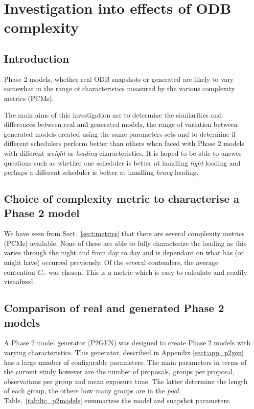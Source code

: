 \section{Investigation into effects of ODB complexity}
\label{sect:exp_complexity}

\subsection{Introduction}
Phase 2 models, whether real ODB snapshots or generated are likely to vary somewhat in the range of characteristics measured by the various complexity metrics (PCMs). 

The main aims of this investigation are to determine the similarities and differences between real and generated models, the range of variation between generated models created using the same parameters sets and to determine if different schedulers perform better than others when faced with Phase 2 models with different \emph{weight} or \emph{loading} characteristics. It is hoped to be able to answer questions such as whether one scheduler is better at handling \emph{light} loading and perhaps a different scheduler is better at handling \emph{heavy} loading.

\subsection{Choice of complexity metric to characterise a Phase 2 model} 
We have seen from Sect.~\ref{sect:metrics} that there are several complexity metrics (PCMs) available. None of these are able to fully characterize the loading as this varies through the night and from day to day and is dependant on what has (or might have) occurred previously. Of the several contenders, the average contention $C_C$ was chosen. This is a metric which is easy to calculate and readily visualized.
 
\subsection{Comparison of real and generated Phase 2 models} 
A Phase 2 model generator (P2GEN) was designed to create Phase 2 models with varying characteristics. This generator, described in Appendix \ref{sect:app_p2gen} has a large number of configurable parameters. The main parameters in terms of the current study however are the number of proposals, groups per proposal, observations per group and mean exposure time. The latter determine the length of each group, the others how many groups are in the \emph{pool}. Table.~\ref{tab:ltc_p2models} summarizes the model and snapshot parameters.

